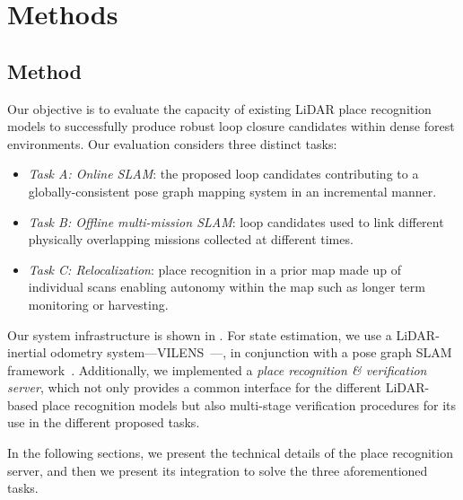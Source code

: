 \chapter{Methods}
\label{ch:methods}

\section{Method}
\label{sec:main}
Our objective is to evaluate the capacity of existing LiDAR place recognition models to successfully produce robust loop closure candidates within dense forest environments. Our evaluation considers three distinct tasks: 
\begin{itemize}
  \listparindent=-20pt
  \item \emph{Task A: Online SLAM}: the proposed loop candidates contributing to a globally-consistent pose graph mapping system in an incremental manner.
  \item \emph{Task B: Offline multi-mission SLAM}: loop candidates used to link different physically overlapping missions collected at different times.
  \item \emph{Task C: Relocalization}: place recognition in a prior map made up of individual scans enabling autonomy within the map such as longer term monitoring or harvesting.
\end{itemize}

Our system infrastructure is shown in . For state estimation, we use a LiDAR-inertial odometry system---VILENS~\cite{wisth2023tro}---, in conjunction with a pose graph SLAM framework~\cite{proudman2022ras}. Additionally, we implemented a \emph{place recognition \& verification server}, which not only provides a common interface for the different LiDAR-based place recognition models but also multi-stage verification procedures for its use in the different proposed tasks.

In the following sections, we present the technical details of the place recognition server, and then we present its integration to solve the three aforementioned tasks.


